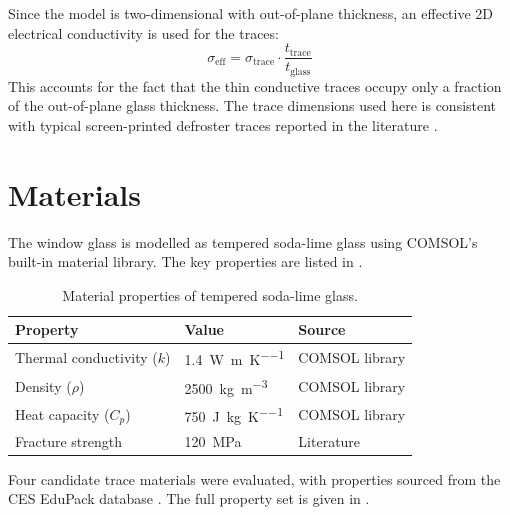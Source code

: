 Since the model is two-dimensional with out-of-plane thickness, an effective 2D electrical conductivity is used for the traces:
\begin{equation}
    \sigma_\text{eff} = \sigma_\text{trace} \cdot \frac{t_\text{trace}}{t_\text{glass}}
    \label{eq:sigma-eff}
\end{equation}
This accounts for the fact that the thin conductive traces occupy only a fraction of the out-of-plane glass thickness. The trace dimensions used here is consistent with typical screen-printed defroster traces reported in the literature \cite{prudenziati2012}.


\section{Materials}
\label{sec:materials}

The window glass is modelled as tempered soda-lime glass using COMSOL's built-in material library. The key properties are listed in .

\begin{table}[H]
    \centering
    \caption{Material properties of tempered soda-lime glass.}
    \label{tab:glass-props}
    \begin{tabular}{@{}lll@{}}
        \toprule
        \textbf{Property} & \textbf{Value} & \textbf{Source} \\
        \midrule
        Thermal conductivity ($k$) & \SI{1.4}{\watt\per\metre\per\kelvin} & COMSOL library \\
        Density ($\rho$) & \SI{2500}{\kilo\gram\per\metre\cubed} & COMSOL library \\
        Heat capacity ($C_p$) & \SI{750}{\joule\per\kilo\gram\per\kelvin} & COMSOL library \\
        Fracture strength & \SI{120}{\mega\pascal} & Literature \\
        \bottomrule
    \end{tabular}
\end{table}

Four candidate trace materials were evaluated, with properties sourced from the CES EduPack database \cite{edupack}. The full property set is given in .

